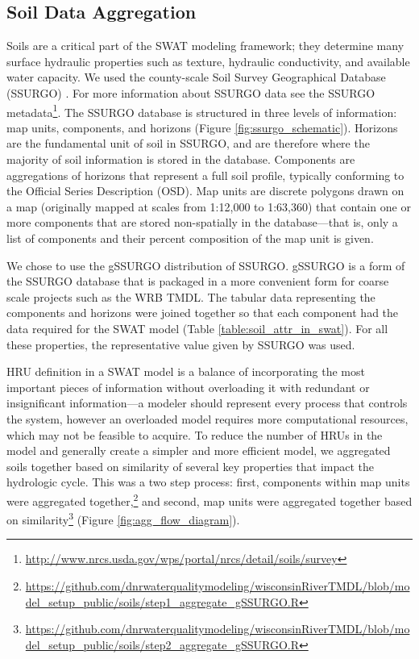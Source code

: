 \subsection{Soil Data Aggregation}\label{sec:soils}

Soils are a critical part of the SWAT modeling framework; they determine many
surface hydraulic properties such as texture, hydraulic conductivity, and
available water capacity. We used the county-scale Soil Survey Geographical
Database (SSURGO) . For more information about SSURGO
data see the SSURGO metadata\footnote{\url{http://www.nrcs.usda.gov/wps/portal/nrcs/detail/soils/survey}}.
The SSURGO database is structured in three levels of information: map units,
components, and horizons (Figure \ref{fig:ssurgo_schematic}). Horizons are the fundamental unit of soil in SSURGO, and are therefore where the majority of soil information is stored in the database.
Components are aggregations of horizons that represent a full soil profile,
typically conforming to the Official Series Description (OSD). Map units
are discrete polygons drawn on a map (originally mapped at scales from 1:12,000
to 1:63,360) that contain one or more components that are stored non-spatially
in the database---that is, only a list of components and their percent
composition of the map unit is given. 

We chose to use the gSSURGO distribution of SSURGO. gSSURGO is a form of the SSURGO database that is packaged in a more convenient form for coarse scale projects such as the WRB TMDL. The tabular data representing the components and
horizons were joined together so that each component had the data required for
the SWAT model (Table \ref{table:soil_attr_in_swat}). For all these properties, the representative value given by
SSURGO was used.

HRU definition in a SWAT model is a balance of incorporating the most important
pieces of information without overloading it with redundant or insignificant
information---a modeler should represent every process that controls the system,
however an overloaded model requires more computational resources, which may not
be feasible to acquire. To reduce the number of HRUs in the model and generally create a 
simpler and more efficient model, we aggregated
soils together based on similarity of several key properties that impact the
hydrologic cycle. This was a two step process: first, components within map
units were aggregated
together,\footnote{\url{https://github.com/dnrwaterqualitymodeling/wisconsinRiverTMDL/blob/model_setup_public/soils/step1_aggregate_gSSURGO.R} } 
and second, map units were aggregated together based on
similarity\footnote{\url{https://github.com/dnrwaterqualitymodeling/wisconsinRiverTMDL/blob/model_setup_public/soils/step2_aggregate_gSSURGO.R}} (Figure \ref{fig:agg_flow_diagram}).

